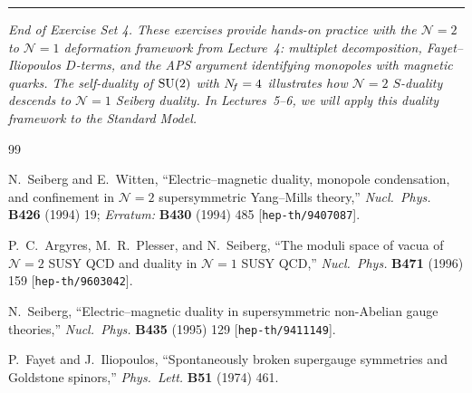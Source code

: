 \documentclass[11pt,a4paper]{article}
\begin{document}
\begin{center}
\rule{0.6\textwidth}{0.4pt}

\textit{End of Exercise Set 4.  These exercises provide hands-on
practice with the $\mathcal{N}=2$ to $\mathcal{N}=1$ deformation
framework from Lecture~4: multiplet decomposition, Fayet--Iliopoulos
$D$-terms, and the APS argument identifying monopoles with magnetic
quarks.  The self-duality of $\mathrm{SU}(2)$ with $N_{\!f} = 4$ illustrates
how $\mathcal{N}=2$ $S$-duality descends to $\mathcal{N}=1$ Seiberg
duality.  In Lectures~5--6, we will apply this duality framework
to the Standard Model.}
\end{center}


\begin{thebibliography}{99}

  N.~Seiberg and E.~Witten,
  ``Electric--magnetic duality, monopole condensation, and confinement
  in $\mathcal{N}=2$ supersymmetric Yang--Mills theory,''
  \textit{Nucl.~Phys.} \textbf{B426} (1994) 19;
  \textit{Erratum:} \textbf{B430} (1994) 485
  [\texttt{hep-th/9407087}].

  P.~C.~Argyres, M.~R.~Plesser, and N.~Seiberg,
  ``The moduli space of vacua of $\mathcal{N}=2$ SUSY QCD and duality
  in $\mathcal{N}=1$ SUSY QCD,''
  \textit{Nucl.~Phys.} \textbf{B471} (1996) 159
  [\texttt{hep-th/9603042}].

  N.~Seiberg,
  ``Electric--magnetic duality in supersymmetric non-Abelian gauge
  theories,''
  \textit{Nucl.~Phys.} \textbf{B435} (1995) 129
  [\texttt{hep-th/9411149}].

  P.~Fayet and J.~Iliopoulos,
  ``Spontaneously broken supergauge symmetries and Goldstone spinors,''
  \textit{Phys.~Lett.} \textbf{B51} (1974) 461.

\end{thebibliography}
\end{document}
